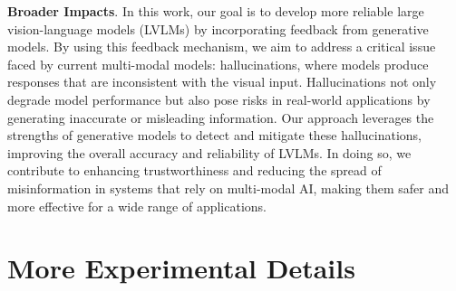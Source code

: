 \textbf{Broader Impacts}. In this work, our goal is to develop more reliable large vision-language models (LVLMs) by incorporating feedback from generative models. By using this feedback mechanism, we aim to address a critical issue faced by current multi-modal models: hallucinations, where models produce responses that are inconsistent with the visual input. Hallucinations not only degrade model performance but also pose risks in real-world applications by generating inaccurate or misleading information. Our approach leverages the strengths of generative models to detect and mitigate these hallucinations, improving the overall accuracy and reliability of LVLMs. In doing so, we contribute to enhancing trustworthiness and reducing the spread of misinformation in systems that rely on multi-modal AI, making them safer and more effective for a wide range of applications.

\section{More Experimental Details}
\label{sec:detail}

